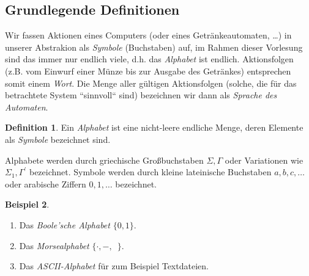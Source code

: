 \documentclass[11pt, a4paper]{article}
\theoremstyle{definition}
\newtheorem{definition}{Definition}[section]
\newtheorem{example}[definition]{Beispiel}
\theoremstyle{plain}
\numberwithin{equation}{section}
\begin{document}
\subsection{Grundlegende Definitionen}\label{sec:awl_def}
Wir fassen Aktionen eines Computers (oder eines Getränkeautomaten, \ldots) in unserer Abstrakion als \textit{Symbole} (Buchstaben) auf, im Rahmen dieser Vorlesung sind das immer nur endlich viele, d.h. das \textit{Alphabet} ist endlich. Aktionsfolgen (z.B. vom Einwurf einer Münze bis zur Ausgabe des Getränkes) entsprechen somit einem \textit{Wort}. Die Menge aller gültigen Aktionsfolgen (solche, die für das betrachtete System ``sinnvoll`` sind) bezeichnen wir dann als \textit{Sprache des Automaten}.
\begin{definition}
	Ein \textit{Alphabet} ist eine nicht-leere endliche Menge, deren Elemente als \textit{Symbole} bezeichnet sind.
\end{definition}
Alphabete werden durch griechische Großbuchstaben \( \Sigma, \Gamma \) oder Variationen wie \( \Sigma_1, \Gamma^\prime \) bezeichnet. Symbole werden durch kleine lateinische Buchstaben \( a, b, c, \ldots \) oder arabische Ziffern \( 0, 1, \ldots \) bezeichnet.
\begin{example}
	\
	\begin{enumerate}
		\item Das \textit{Boole'sche Alphabet} \( \{ 0, 1 \} \).
		\item Das \textit{Morsealphabet} \( \{ \cdot, -, \,\,\, \} \).
		\item Das \textit{ASCII-Alphabet} für zum Beispiel Textdateien.
	\end{enumerate}
\end{example}
\end{document}
